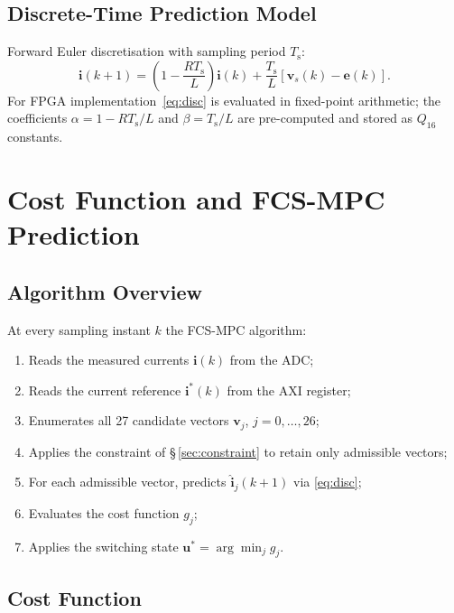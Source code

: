 \documentclass[11pt,a4paper]{article}
\newcommand{\Ts}{T_{\mathrm{s}}}
\newcommand{\iref}{\bm{i}^{*}}
\newcommand{\ipred}{\hat{\bm{i}}}
\begin{document}
\subsection{Discrete-Time Prediction Model}
\label{sec:disc}

Forward Euler discretisation with sampling period $\Ts$:
\begin{equation}
  \bm{i}(k+1) = \left(1 - \frac{R\Ts}{L}\right)\bm{i}(k)
               + \frac{\Ts}{L}\left[\bm{v}_s(k) - \bm{e}(k)\right].
  \label{eq:disc}
\end{equation}
For FPGA implementation~\eqref{eq:disc} is evaluated in fixed-point
arithmetic; the coefficients $\alpha = 1 - R\Ts/L$ and $\beta = \Ts/L$
are pre-computed and stored as $Q_{16}$ constants.

\section{Cost Function and FCS-MPC Prediction}
\label{sec:mpc}

\subsection{Algorithm Overview}
\label{sec:algo}

At every sampling instant $k$ the FCS-MPC algorithm:
\begin{enumerate}
  \item Reads the measured currents $\bm{i}(k)$ from the ADC;
  \item Reads the current reference $\iref(k)$ from the AXI register;
  \item Enumerates all 27 candidate vectors $\bm{v}_j$, $j=0,\ldots,26$;
  \item Applies the constraint of \S\,\ref{sec:constraint} to retain only
        admissible vectors;
  \item For each admissible vector, predicts $\ipred_j(k+1)$ via
        \eqref{eq:disc};
  \item Evaluates the cost function $g_j$;
  \item Applies the switching state $\bm{u}^* = \arg\min_j g_j$.
\end{enumerate}

\subsection{Cost Function}
\label{sec:cost}
\end{document}
